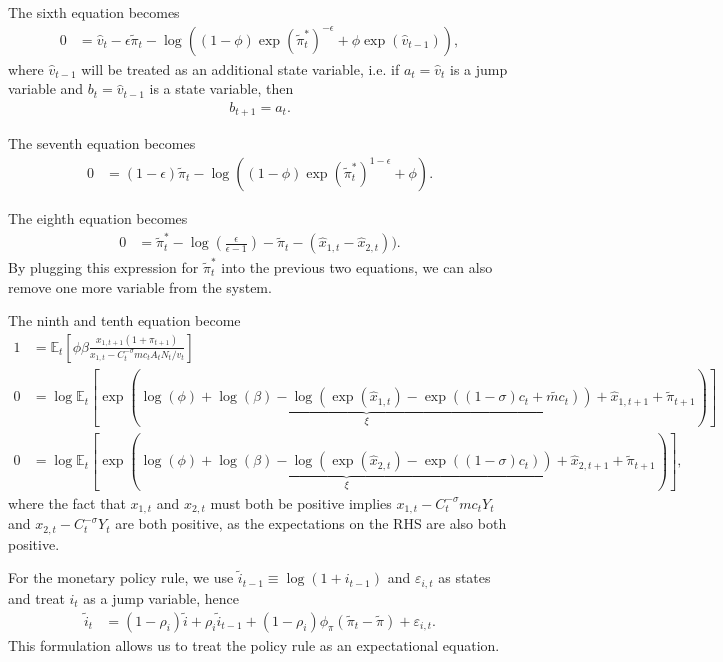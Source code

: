 \documentclass[12 pt, oneside]{article}
\theoremstyle{definition}
\theoremstyle{definition}
\theoremstyle{definition}
\newcommand{\E}{\mathbb{E}}
\newcommand{\fd}{\vspace{2.5mm}}
\begin{document}
The sixth equation becomes
\begin{align*}
  0 & = \hat{v}_t - \epsilon \tilde{\pi}_t - \log((1 - \phi) \exp(\tilde{\pi}_t^*)^{ - \epsilon} + \phi \exp(\hat{v}_{t - 1})),
\end{align*}
where $\hat{v}_{t - 1}$ will be treated as an additional state variable, i.e. if $a_t = \hat{v}_t$ is a jump variable and $b_t = \hat{v}_{t - 1}$
is a state variable, then
\begin{align*}
  b_{t + 1} = a_t.
\end{align*}

The seventh equation becomes
\begin{align*}
  0 & = (1 - \epsilon)\tilde{\pi}_t - \log((1 - \phi) \exp(\tilde{\pi}_t^*)^{1 - \epsilon} + \phi).
\end{align*}

The eighth equation becomes
\begin{align*}
  0 & = \tilde{\pi}_t^* - \log\left(\frac{\epsilon}{\epsilon - 1}\right) - \tilde{\pi}_t - (\hat{x}_{1, t} - \hat{x}_{2, t})).
\end{align*}
By plugging this expression for $\tilde{\pi}_t^*$ into the previous two equations, we can also remove one more variable from the system.

\fd

The ninth and tenth equation become
\begin{align*}
  1 & = \E_t\left[\phi \beta\frac{x_{1, t + 1}(1 + \pi_{t + 1})}{x_{1, t} - C_t^{-\sigma} mc_t A_tN_t / v_t}\right]\\
  0 & = \log\E_t\left[\exp\left(\underbrace{\log(\phi) + \log(\beta)   - \log(\exp(\hat{x}_{1, t}) - \exp((1-\sigma) c_t + \tilde{mc}_t))}_{\xi} + \hat{x}_{1, t + 1} + \tilde{\pi}_{t + 1}\right)\right]\\
  0 & = \log\E_t\left[\exp\left(\underbrace{\log(\phi) + \log(\beta)  - \log(\exp(\hat{x}_{2, t}) - \exp((1-\sigma) c_t))}_{\xi} + \hat{x}_{2, t + 1} + \tilde{\pi}_{t + 1}\right)\right],
\end{align*}
where the fact that $x_{1,t}$ and $x_{2, t}$ must both be positive implies $x_{1, t} - C_t^{-\sigma} mc_t Y_t$ and $x_{2, t} - C_t^{-\sigma}Y_t$ are both positive, as the expectations on the RHS are also both positive.

\fd

For the monetary policy rule, we use $\tilde{i}_{t - 1} \equiv \log(1 + i_{t - 1})$ and $\varepsilon_{i, t}$ as states and treat $i_t$ as a jump variable, hence
\begin{align*}
  \tilde{i}_t & = (1 - \rho_i) \tilde{i} + \rho_i \tilde{i}_{t - 1} + (1 - \rho_i)\phi_\pi (\tilde{\pi}_t - \tilde{\pi})  + \varepsilon_{i, t}.
\end{align*}
This formulation allows us to treat the policy rule as an expectational equation.
\end{document}
